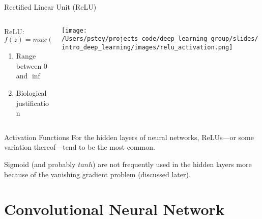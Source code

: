 \documentclass[pdf]{beamer}
\begin{document}
	\begin{frame}{Rectified Linear Unit (ReLU)}
	\begin{columns}
	\begin{column}{0.5\textwidth}
	ReLU: $f(z) = max(0, z)$
	\vspace{1em}
	\begin{enumerate}
		\item Range between 0 and $\inf$
		\item Biological justification	
	\end{enumerate}
	\end{column}
	
	\begin{column}{0.5\textwidth}
	\begin{center}
		\texttt{[image: /Users/pstey/projects\_code/deep\_learning\_group/slides/intro\_deep\_learning/images/relu\_activation.png]}
	\end{center}
	\end{column}
	\end{columns}
	\end{frame}

	
	\begin{frame}{Activation Functions}
	For the hidden layers of neural networks, ReLUs---or some variation thereof---tend to be the most common.
	
	\vspace{2em}
	
	Sigmoid (and probably $tanh$) are not frequently used in the hidden layers more because of the vanishing gradient problem (discussed later).
	\end{frame}



\section{Convolutional Neural Network}
\end{document}
